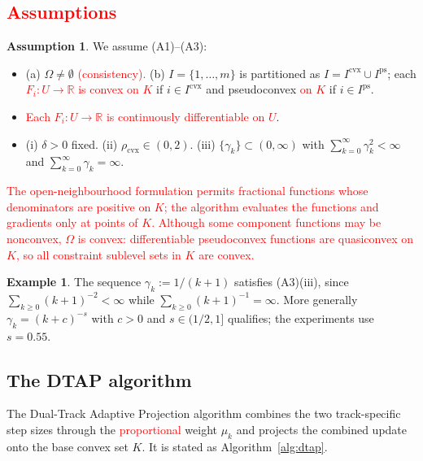 \documentclass[]{interact}
\theoremstyle{plain}
\theoremstyle{definition}
\newtheorem{example}[theorem]{Example}
\newtheorem{assumption}{Assumption}
\theoremstyle{remark}
\newcommand{\R}{\mathbb{R}}
\newcommand{\cvx}{\mathrm{cvx}}
\newcommand{\ps}{\mathrm{ps}}
\begin{document}
\subsection{\textcolor{red}{Assumptions}}\label{ssec:assumptions}
\begin{assumption}\label{ass:standing}
We assume \textup{(A1)--(A3)}:
\begin{itemize}[leftmargin=2.4em,itemsep=2pt]
\item[\textup{(A1)}] \textup{(a)} $\Omega\ne\emptyset$ \leavevmode\textcolor{red}{(consistency).} \textup{(b)} $I=\{1,\dots,m\}$
is partitioned as $I=I^{\cvx}\cup I^{\ps}$; each \leavevmode\textcolor{red}{$F_i:U\to\R$ is convex on $K$} if
$i\in I^{\cvx}$ and pseudoconvex \leavevmode\textcolor{red}{on $K$} if $i\in I^{\ps}$.
\item[\textup{(A2)}] \leavevmode\textcolor{red}{Each $F_i:U\to\R$ is continuously differentiable on $U$}.
\item[\textup{(A3)}] \textup{(i)} $\delta>0$ fixed. \textup{(ii)}
$\rho_{\cvx}\in(0,2)$. \textup{(iii)} $\{\gamma_k\}\subset(0,\infty)$ with
$\sum_{k=0}^\infty\gamma_k^2<\infty$ and $\sum_{k=0}^\infty\gamma_k=\infty$.
\end{itemize}
\end{assumption}
\leavevmode\textcolor{red}{The open-neighbourhood formulation permits fractional functions whose denominators are
positive on $K$; the algorithm evaluates the functions and gradients only at points of $K$.
Although some component functions may be nonconvex, $\Omega$ is convex: differentiable
pseudoconvex functions are quasiconvex on $K$, so all constraint sublevel sets in $K$ are convex.}
\begin{example}\label{ex:gamma}
The sequence $\gamma_k:=1/(k+1)$ satisfies (A3)(iii), since $\sum_{k\ge0}(k+1)^{-2}<\infty$
while $\sum_{k\ge0}(k+1)^{-1}=\infty$. More generally $\gamma_k=(k+c)^{-s}$ with $c>0$
and $s\in(1/2,1]$ qualifies; the experiments use $s=0.55$.
\end{example}

\subsection{The DTAP algorithm}\label{ssec:algorithm}
The Dual-Track Adaptive Projection algorithm combines the two track-specific step sizes
through the \leavevmode\textcolor{red}{proportional} weight $\mu_k$ and projects the combined update onto the base convex
set $K$. It is stated as Algorithm~\ref{alg:dtap}.
\end{document}
